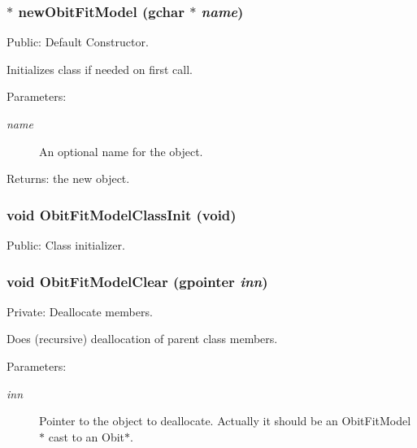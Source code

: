 \subsubsection{$\ast$ new\-Obit\-Fit\-Model (gchar $\ast$ {\em name})}\label{ObitFitModel_8c_a7}


Public: Default Constructor. 

Initializes class if needed on first call. \begin{Desc}
\item[Parameters:]
\begin{description}
\item[{\em name}]An optional name for the object. \end{description}
\end{Desc}
\begin{Desc}
\item[Returns:]the new object. \end{Desc}
\subsubsection{\setlength{\rightskip}{0pt plus 5cm}void Obit\-Fit\-Model\-Class\-Init (void)}\label{ObitFitModel_8c_a13}


Public: Class initializer. 

\subsubsection{\setlength{\rightskip}{0pt plus 5cm}void Obit\-Fit\-Model\-Clear (gpointer {\em inn})}\label{ObitFitModel_8c_a4}


Private: Deallocate members. 

Does (recursive) deallocation of parent class members. \begin{Desc}
\item[Parameters:]
\begin{description}
\item[{\em inn}]Pointer to the object to deallocate. Actually it should be an Obit\-Fit\-Model$\ast$ cast to an Obit$\ast$. \end{description}
\end{Desc}
